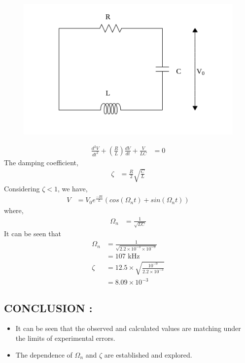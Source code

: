 \documentclass[12pt]{article}
\begin{document}
\begin{figure}[!ht]
	\includegraphics[width=\columnwidth]{circuit.png}
\end{figure}
\begin{align}
	\frac{d^2V}{dt^2} + \left(\frac{R}{L}\right) \frac{dV}{dt} + \frac{V}{LC} &= 0 \label{eq:de}
\end{align}
The damping coefficient, 
\begin{align}
	\zeta &= \frac{R}{2} \sqrt{\frac{C}{L}}
\end{align}
Considering $\zeta < 1$, we have, 
\begin{align}
	V &= V_{0} e^{\frac{-Rt}{L}} \left(cos(\Omega_{n} t ) + sin(\Omega_{n} t ) \right)
\end{align}
where, 
\begin{align}
	\Omega_{n} &= \frac{1}{\sqrt{LC}}
\end{align}
It can be seen that 
\begin{align}
	\Omega_{n} &= \frac{1}{\sqrt{2.2 \times 10^{-3} \times 10^{-9} }} \\
	&= 107 \text{ kHz} \\
	\zeta &= 12.5 \times \sqrt{\frac{10^{-9}}{2.2 \times 10^{-3}}} \\
	&= 8.09 \times 10^{-3}
\end{align}

\subsection{\textbf{CONCLUSION : }}
\begin{itemize}
\item It can be seen that the observed and calculated values are matching under the limits of experimental errors.
\item The dependence of $\Omega_{n}$ and $\zeta$ are established and explored. 
\end{itemize}
\end{document}
